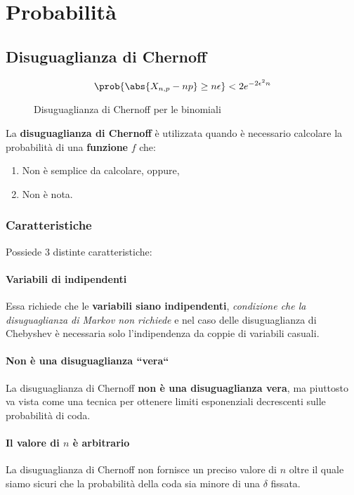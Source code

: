 \documentclass[\main/main.tex]{subfiles}
\begin{document}
\chapter{Probabilità}
\section{Disuguaglianza di Chernoff}
\begin{figure}
  \[
    \prob{\abs{X_{n,p} - np} \geq n\epsilon} < 2e^{-2\epsilon^2 n}
  \]
  \caption{Disuguaglianza di Chernoff per le binomiali}
\end{figure}
La \textbf{disuguaglianza di Chernoff} è utilizzata quando è necessario calcolare la probabilità di una \textbf{funzione} \(f\) che:
\begin{enumerate}
  \item Non è semplice da calcolare, oppure,
  \item Non è nota.
\end{enumerate}

\subsection{Caratteristiche}

Possiede 3 distinte caratteristiche:

\subsubsection{Variabili di indipendenti}
Essa richiede che le \textbf{variabili siano indipendenti}, \textit{condizione che la disuguaglianza di Markov non richiede} e nel caso delle disuguaglianza di Chebyshev è necessaria solo l'indipendenza da coppie di variabili casuali.

\subsubsection{Non è una disuguaglianza “vera“}
La disuguaglianza di Chernoff \textbf{non è una disuguaglianza vera}, ma piuttosto va vista come una tecnica per ottenere limiti esponenziali decrescenti sulle probabilità di coda.

\subsubsection{Il valore di \(n\) è arbitrario}
La disuguaglianza di Chernoff non fornisce un preciso valore di \(n\) oltre il quale siamo sicuri che la probabilità della coda sia minore di una \(\delta \) fissata.
\end{document}
